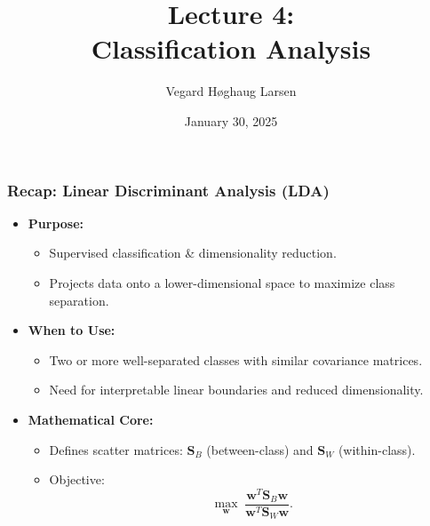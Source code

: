 \documentclass[aspectratio=169]{beamer}
\title{Lecture 4:\\ Classification Analysis}
\institute{GRA4160: Predictive Modelling with Machine Learning}
\date{January 30, 2025}
\author{Vegard H\o ghaug Larsen}
\begin{document}
\maketitle


\begin{frame}
    \frametitle{Recap: Linear Discriminant Analysis (LDA)}
    \begin{itemize}
        \item \textbf{Purpose:}
            \begin{itemize}
                \item Supervised classification \& dimensionality reduction.
                \item Projects data onto a lower-dimensional space to maximize class separation.
            \end{itemize}
        \item \textbf{When to Use:}
            \begin{itemize}
                \item Two or more well-separated classes with similar covariance matrices.
                \item Need for interpretable linear boundaries and reduced dimensionality.
            \end{itemize}
        \item \textbf{Mathematical Core:}
            \begin{itemize}
                \item Defines scatter matrices: \(\mathbf{S}_B\) (between-class) and \(\mathbf{S}_W\) (within-class).
                \item Objective: 
                \[
                    \max_{\mathbf{w}} \; \frac{\mathbf{w}^T \mathbf{S}_B \mathbf{w}}{\mathbf{w}^T \mathbf{S}_W \mathbf{w}}.
                \]
            \end{itemize}
    \end{itemize}
\end{frame}
\end{document}
